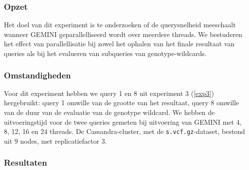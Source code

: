 \subsubsection{Opzet}

Het doel van dit experiment is te onderzoeken of de querysnelheid meeschaalt wanneer GEMINI geparallelliseerd wordt over meerdere threads. We bestuderen het effect van parallellisatie bij zowel het ophalen van het finale resultaat van queries als bij het evalueren van subqueries van genotype-wildcards.

\subsubsection{Omstandigheden}

Voor dit experiment hebben we query 1 en 8 uit experiment 3 (\ref{exp3}) hergebruikt: query 1 omwille van de grootte van het resultaat, query 8 omwille van de duur van de evaluatie van de genotype wildcard. We hebben de uitvoeringstijd voor de twee queries gemeten bij uitvoering van GEMINI met 4, 8, 12, 16 en 24 threads. De Cassandra-cluster, met de \texttt{s.vcf.gz}-dataset, bestond uit 9 nodes, met replicatiefactor 3.

\newpage
\subsubsection{Resultaten}

